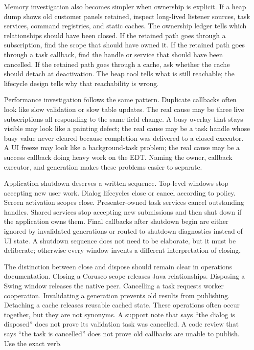 Memory investigation also becomes simpler when ownership is explicit. If a
heap dump shows old customer panels retained, inspect long-lived listener
sources, task services, command registries, and static caches. The ownership
ledger tells which relationships should have been closed. If the retained path
goes through a subscription, find the scope that should have owned it. If the
retained path goes through a task callback, find the handle or service that
should have been cancelled. If the retained path goes through a cache, ask
whether the cache should detach at deactivation. The heap tool tells what is
still reachable; the lifecycle design tells why that reachability is wrong.

Performance investigation follows the same pattern. Duplicate callbacks often
look like slow validation or slow table updates. The real cause may be three
live subscriptions all responding to the same field change. A busy overlay that
stays visible may look like a painting defect; the real cause may be a task
handle whose busy value never cleared because completion was delivered to a
closed executor. A UI freeze may look like a background-task problem; the real
cause may be a success callback doing heavy work on the EDT. Naming the owner,
callback executor, and generation makes these problems easier to separate.

Application shutdown deserves a written sequence. Top-level windows stop
accepting new user work. Dialog lifecycles close or cancel according to policy.
Screen activation scopes close. Presenter-owned task services cancel
outstanding handles. Shared services stop accepting new submissions and then
shut down if the application owns them. Final callbacks after shutdown begin
are either ignored by invalidated generations or routed to shutdown diagnostics
instead of UI state. A shutdown sequence does not need to be elaborate, but it
must be deliberate; otherwise every window invents a different interpretation
of closing.

The distinction between close and dispose should remain clear in operations
documentation. Closing a Corusco scope releases Java relationships. Disposing a
Swing window releases the native peer. Cancelling a task requests worker
cooperation. Invalidating a generation prevents old results from publishing.
Detaching a cache releases reusable cached state. These operations often occur
together, but they are not synonyms. A support note that says ``the dialog is
disposed'' does not prove its validation task was cancelled. A code review that
says ``the task is cancelled'' does not prove old callbacks are unable to
publish. Use the exact verb.

